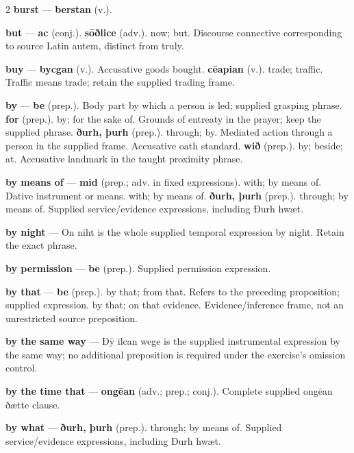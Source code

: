 \begin{multicols}{2}
\textbf{burst} — \textbf{berstan} (v.).\par
\textbf{but} — \textbf{ac} (conj.).  \textbf{sōðlice} (adv.). now; but. Discourse connective corresponding to source Latin autem, distinct from truly.\par
\textbf{buy} — \textbf{bycgan} (v.). Accusative goods bought. \textbf{cēapian} (v.). trade; traffic. Traffic means trade; retain the supplied trading frame.\par
\textbf{by} — \textbf{be} (prep.). Body part by which a person is led; supplied grasping phrase. \textbf{for} (prep.). by; for the sake of. Grounds of entreaty in the prayer; keep the supplied phrase. \textbf{ðurh, þurh} (prep.). through; by. Mediated action through a person in the supplied frame. Accusative oath standard. \textbf{wið} (prep.). by; beside; at. Accusative landmark in the taught proximity phrase.\par
\textbf{by means of} — \textbf{mid} (prep.; adv. in fixed expressions). with; by means of. Dative instrument or means. with; by means of. \textbf{ðurh, þurh} (prep.). through; by means of. Supplied service/evidence expressions, including Ðurh hwæt.\par
\textbf{by night} — On niht is the whole supplied temporal expression by night. Retain the exact phrase.\par
\textbf{by permission} — \textbf{be} (prep.). Supplied permission expression.\par
\textbf{by that} — \textbf{be} (prep.). by that; from that. Refers to the preceding proposition; supplied expression. by that; on that evidence. Evidence/inference frame, not an unrestricted source preposition.\par
\textbf{by the same way} — Ðȳ ilcan wege is the supplied instrumental expression by the same way; no additional preposition is required under the exercise’s omission control.\par
\textbf{by the time that} — \textbf{ongēan} (adv.; prep.; conj.). Complete supplied ongēan ðætte clause.\par
\textbf{by what} — \textbf{ðurh, þurh} (prep.). through; by means of. Supplied service/evidence expressions, including Ðurh hwæt.\par

\end{multicols}
